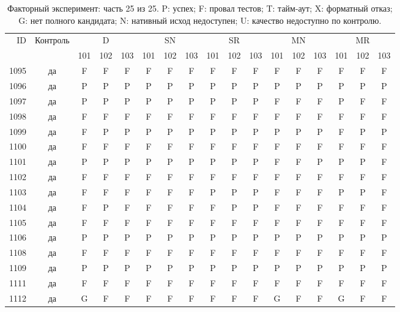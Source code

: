 \begin{table}[p]\centering\footnotesize
\setlength{\tabcolsep}{3pt}
\caption{Факторный эксперимент: часть 25 из 25. P: успех; F: провал тестов; T: тайм-аут; X: форматный отказ; G: нет полного кандидата; N: нативный исход недоступен; U: качество недоступно по контролю.}
\begin{tabular*}{\textwidth}{@{\extracolsep{\fill}}rcccccccccccccccc}\toprule
ID & Контроль & \multicolumn{3}{c}{D} & \multicolumn{3}{c}{SN} & \multicolumn{3}{c}{SR} & \multicolumn{3}{c}{MN} & \multicolumn{3}{c}{MR}\\
\cmidrule(lr){3-5}\cmidrule(lr){6-8}\cmidrule(lr){9-11}\cmidrule(lr){12-14}\cmidrule(lr){15-17}
 & & 101 & 102 & 103 & 101 & 102 & 103 & 101 & 102 & 103 & 101 & 102 & 103 & 101 & 102 & 103\\\midrule
1095 & да & F & F & F & F & F & F & F & F & F & F & F & F & F & F & F\\
1096 & да & P & P & P & P & P & P & P & P & P & P & P & P & P & P & P\\
1097 & да & P & P & P & P & P & P & P & P & P & F & F & F & P & F & F\\
1098 & да & F & F & F & F & F & F & F & F & F & F & F & F & F & F & F\\
1099 & да & F & P & P & P & P & P & P & P & P & P & P & P & F & P & P\\
1100 & да & F & F & F & F & F & F & F & F & F & F & F & F & F & F & F\\
1101 & да & P & P & P & P & P & P & P & P & P & F & F & P & P & P & F\\
1102 & да & F & F & F & F & F & F & F & F & F & F & F & F & F & F & F\\
1103 & да & F & F & F & F & F & F & P & P & P & F & F & F & P & P & F\\
1104 & да & F & P & F & F & F & F & F & P & P & F & F & F & F & F & F\\
1105 & да & F & F & F & F & F & F & F & F & F & F & F & F & F & F & F\\
1106 & да & P & P & P & P & P & P & P & P & P & P & P & P & P & P & P\\
1108 & да & F & F & F & F & F & F & F & F & F & F & F & F & F & F & F\\
1109 & да & P & P & P & P & P & P & P & P & P & P & P & P & P & P & P\\
1111 & да & F & F & F & F & F & F & F & F & F & F & F & F & F & F & F\\
1112 & да & G & F & F & F & F & F & F & F & F & G & F & F & G & F & F\\

\end{tabular*}
\end{table}

